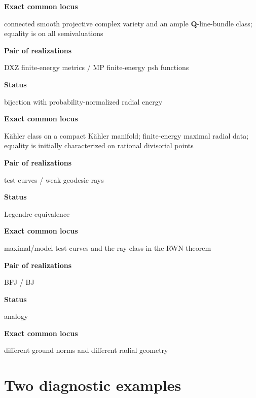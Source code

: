 \textbf{Exact common locus}\par\nopagebreak
connected smooth projective complex variety and an ample
$\mathbf Q$-line-bundle class; equality is on all semivaluations

\medskip
\textbf{Pair of realizations}\par\nopagebreak
DXZ finite-energy metrics / MP finite-energy psh functions\par\nopagebreak

\textbf{Status}\par\nopagebreak
bijection with probability-normalized radial energy\par\nopagebreak

\textbf{Exact common locus}\par\nopagebreak
K\"ahler class on a compact K\"ahler manifold; finite-energy maximal radial
data; equality is initially characterized on rational divisorial points

\medskip
\textbf{Pair of realizations}\par\nopagebreak
test curves / weak geodesic rays\par\nopagebreak

\textbf{Status}\par\nopagebreak
Legendre equivalence\par\nopagebreak

\textbf{Exact common locus}\par\nopagebreak
maximal/model test curves and the ray class in the RWN theorem

\medskip
\textbf{Pair of realizations}\par\nopagebreak
BFJ / BJ\par\nopagebreak

\textbf{Status}\par\nopagebreak
analogy\par\nopagebreak

\textbf{Exact common locus}\par\nopagebreak
different ground norms and different radial geometry

\endgroup

\section{Two diagnostic examples}
\label{sec:dict-diagnostics}

